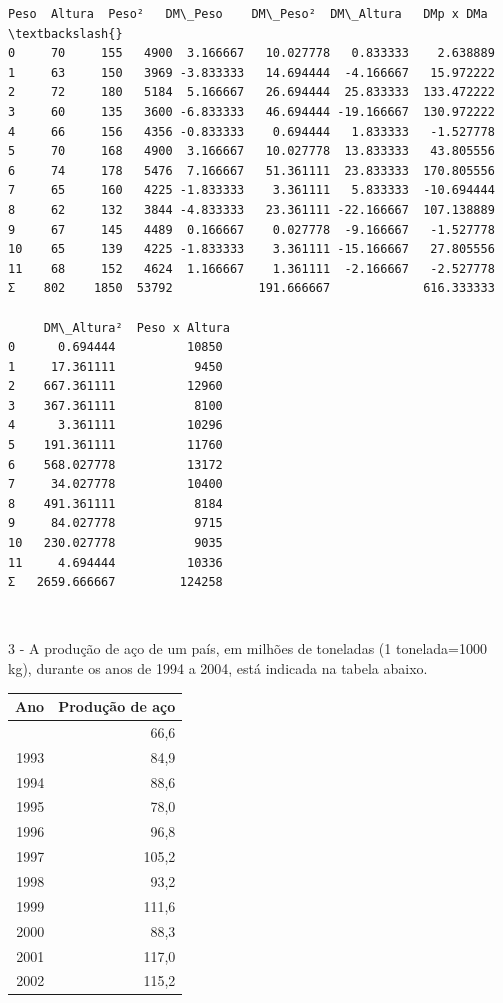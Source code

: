 \documentclass[11pt]{article}
\begin{document}
    
    \begin{Verbatim}[commandchars=\\\{\}]
    Peso  Altura  Peso²   DM\_Peso    DM\_Peso²  DM\_Altura   DMp x DMa  \textbackslash{}
0     70     155   4900  3.166667   10.027778   0.833333    2.638889   
1     63     150   3969 -3.833333   14.694444  -4.166667   15.972222   
2     72     180   5184  5.166667   26.694444  25.833333  133.472222   
3     60     135   3600 -6.833333   46.694444 -19.166667  130.972222   
4     66     156   4356 -0.833333    0.694444   1.833333   -1.527778   
5     70     168   4900  3.166667   10.027778  13.833333   43.805556   
6     74     178   5476  7.166667   51.361111  23.833333  170.805556   
7     65     160   4225 -1.833333    3.361111   5.833333  -10.694444   
8     62     132   3844 -4.833333   23.361111 -22.166667  107.138889   
9     67     145   4489  0.166667    0.027778  -9.166667   -1.527778   
10    65     139   4225 -1.833333    3.361111 -15.166667   27.805556   
11    68     152   4624  1.166667    1.361111  -2.166667   -2.527778   
Σ    802    1850  53792            191.666667             616.333333   

     DM\_Altura²  Peso x Altura  
0      0.694444          10850  
1     17.361111           9450  
2    667.361111          12960  
3    367.361111           8100  
4      3.361111          10296  
5    191.361111          11760  
6    568.027778          13172  
7     34.027778          10400  
8    491.361111           8184  
9     84.027778           9715  
10   230.027778           9035  
11     4.694444          10336  
Σ   2659.666667         124258  
    \end{Verbatim}

    
    \begin{center}
    \end{center}
    { \hspace*{\fill} \\}
    
    3 - A produção de aço de um país, em milhões de toneladas (1
tonelada=1000 kg), durante os anos de 1994 a 2004, está indicada na
tabela abaixo.

{\def\LTcaptype{none} %
\begin{longtable}[]{@{}rr@{}}
\toprule\noalign{}
Ano & Produção de aço \\
\midrule\noalign{}
\endhead
\bottomrule\noalign{}
\endlastfoot
1992 & 66,6 \\
1993 & 84,9 \\
1994 & 88,6 \\
1995 & 78,0 \\
1996 & 96,8 \\
1997 & 105,2 \\
1998 & 93,2 \\
1999 & 111,6 \\
2000 & 88,3 \\
2001 & 117,0 \\
2002 & 115,2 \\
\end{longtable}
}
\end{document}
